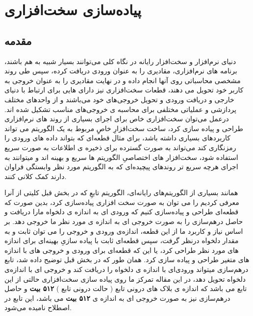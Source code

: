 \chapter{
	پیاده‌سازی سخت‌افزاری 
}

\section{
	مقدمه
}

دنیای نرم‌افزار و سخت‌افزار رایانه در نگاه کلی می‌توانند بسیار شبیه به هم باشند، برنامه های نرم‌افزاری، مقادیری را به عنوان ورودی دریافت کرده، سپس طی روند مشخصی محاسباتی روی آنها انجام داده و در نهایت مقادیری را به عنوان خروجی به کاربر خود تحویل می دهند، قطعات سخت‌افزاری نیز دارای 
هایی برای ارتباط با دنیای خارجی و دریافت ورودی‌ و تحویل خروجی‌های خود می‌باشند و از واحدهای مختلف پردازشی و عملیاتی مختلفی برای محاسبه ی خروجی‌های مناسب تشکیل شده اند. درعمل می‌توان سخت‌افزاری خاص برای اجرای بسیاری از روند های نرم‌افزاری طراحی و پیاده سازی کرد، ساخت سخت‌افزارِ خاصِِ مربوط به یک الگوریتم می تواند کاربرد‌های بسیاری داشته باشد، برای مثال قطعه‌ای که بتواند داده های ورودی را رمزنگاری کند می‌تواند به صورت گسترده برای ذخیره ی اطلاعات به صورت سریع استفاده شود، سخت‌افزار های اختصاصیِ الگوریتم ها سریع و بهینه اند و میتوانند به اجرای هرچه سریع تر روندهای پیچیده‌ای که به الگوریتم مورد نظر وابستگی فراوان دارند کمک کلانی کنند.

همانند بسیاری از الگوریتم‌های رایانه‌ای، الگوریتم تابعِ 
که در بخش قبل کلیتی از آنرا معرفی کردیم را می توان به صورت سخت افزاری پیاده‌سازی کرد، بدین صورت که قطعه‌ای طراحی و پیاده‌سازی کنیم که ورودی ای به اندازه ی دلخواه مارا دریافت و حاصل درهم‌سازی را به صورت خروجی ای به اندازه ی مورد نظر ما خروجی دهد. بر اساس نیاز و کاربرد ما از این قطعه، اندازه‌ی ورودی و خروجی را می توان ثابت و به مقدار دلخواه درنظر گرفت، سپس قطعه‌ای ثابت با پیاده سازیِ بهینه‌ای برای اندازه های مورد نظر طراحی کرد، یا این که قطعه‌ای  برای ورودی و خروجی های با اندازه های متغیر طراحی و پیاده سازی کرد. همان طور که در بخش قبل توضیح داده شد، تابع درهم‌سازی 
میتواند ورودی‌ای با اندازه ی دلخواه را دریافت کند و خروجی ای با اندازه‌ی دلخواه تحویل دهد، در این مقاله تمرکز ما روی پیاده سازی سخت‌افزاری حالتی از این تابع می باشد که اندازه ی بلاک های درونی تابع ( حالت درونی تابع ) 
\textbf{۵۱۲ بیت}
و حاصل درهم‌سازی نیز به صورت خروجی ای به اندازه ی 
\textbf{۵۱۲ بیت}
می باشد، این تابع در اصطلاح 
نامیده می‌شود.


